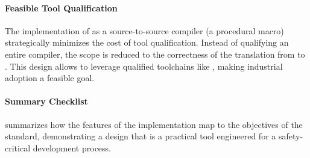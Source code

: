 \paragraph{Feasible Tool Qualification}
The implementation of \GRust as a source-to-source compiler (a procedural macro)
strategically minimizes the cost of tool qualification. Instead of qualifying an entire compiler,
the scope is reduced to the correctness of the translation from \GRust to \Rust. This design allows
\GRust to leverage qualified \Rust toolchains like \ferrocene, making industrial adoption a feasible
goal.

\paragraph{Summary Checklist}
 summarizes how the features of the \GRust implementation map to the
objectives of the \iso standard, demonstrating a design that is a practical tool engineered for a
safety-critical development process.

